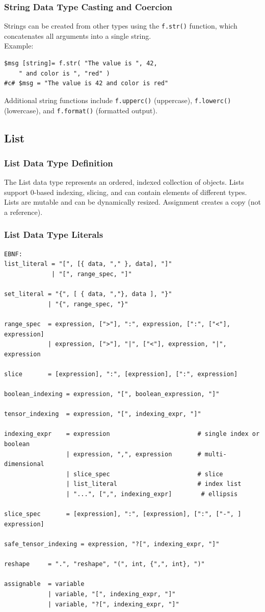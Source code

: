 \subsubsection{String Data Type Casting and Coercion}
Strings can be created from other types using the \texttt{f.str()} function, which concatenates all arguments into a single string.\\
Example:
\begin{verbatim}
$msg [string]= f.str( "The value is ", 42, 
    " and color is ", "red" )
#c# $msg = "The value is 42 and color is red"
\end{verbatim}
Additional string functions include \texttt{f.upperc()} (uppercase), \texttt{f.lowerc()} (lowercase), and \texttt{f.format()} (formatted output).
\subsection{List}
\subsubsection{List Data Type Definition}
The List data type represents an ordered, indexed collection of objects. Lists support 0-based indexing, slicing, and can contain elements of different types. Lists are mutable and can be dynamically resized. Assignment creates a copy (not a reference).
\subsubsection{List Data Type Literals}
\begin{verbatim}
EBNF:
list_literal = "[", [{ data, "," }, data], "]"
             | "[", range_spec, "]"

set_literal = "{", [ { data, ","}, data ], "}"
            | "{", range_spec, "}"

range_spec  = expression, [">"], ":", expression, [":", ["<"], expression]
            | expression, [">"], "|", ["<"], expression, "|", expression

slice       = [expression], ":", [expression], [":", expression]

boolean_indexing = expression, "[", boolean_expression, "]"

tensor_indexing  = expression, "[", indexing_expr, "]"

indexing_expr    = expression                        # single index or boolean
                 | expression, ",", expression       # multi-dimensional
                 | slice_spec                        # slice
                 | list_literal                      # index list
                 | "...", [",", indexing_expr]        # ellipsis

slice_spec       = [expression], ":", [expression], [":", ["-", ] expression]

safe_tensor_indexing = expression, "?[", indexing_expr, "]"

reshape     = ".", "reshape", "(", int, {",", int}, ")"

assignable  = variable
            | variable, "[", indexing_expr, "]"
            | variable, "?[", indexing_expr, "]"
\end{verbatim}


